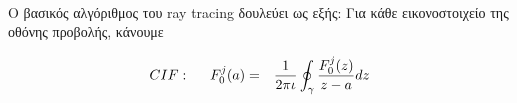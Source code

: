 \begin{sloppypar}
\paragraph{}	
	O βασικός αλγόριθμος του ray tracing δουλεύει ως εξής: Για κάθε εικονοστοιχείο της οθόνης προβολής, κάνουμε 


\begin{eqnarray}
CIF: \hspace*{5mm}F_0^j(a) &=& \frac{1}{2\pi \iota} \oint_{\gamma} \frac{F_0^j(z)}{z - a} dz
\end{eqnarray}

\end{sloppypar}

